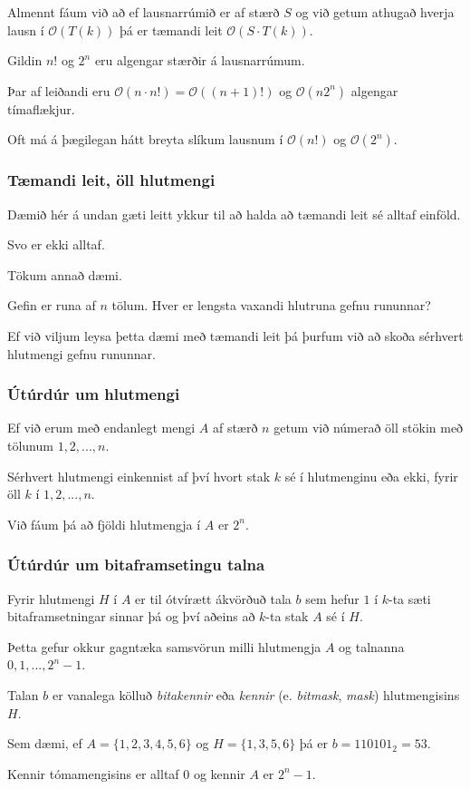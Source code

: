 {
	{
		\item<1-> Almennt fáum við að ef lausnarrúmið er af stærð $S$ og við getum athugað hverja lausn í $\mathcal{O}(T(k))$
			þá er tæmandi leit $\mathcal{O}(S \cdot T(k))$.
		\item<2-> Gildin $n!$ og $2^n$ eru algengar stærðir á lausnarrúmum.
		\item<3-> Þar af leiðandi eru $\mathcal{O}(n \cdot n!) = \mathcal{O}((n + 1)!)$ og $\mathcal{O}(n 2^n)$ algengar tímaflækjur.
		\item<4-> Oft má á þægilegan hátt breyta slíkum lausnum í $\mathcal{O}(n!)$ og $\mathcal{O}(2^n)$.
	}
}

{
	\frametitle{Tæmandi leit, öll hlutmengi}
	{
		\item<1-> Dæmið hér á undan gæti leitt ykkur til að halda að tæmandi leit sé alltaf einföld.
		\item<2-> Svo er ekki alltaf.
		\item<3-> Tökum annað dæmi.
		\item<4-> Gefin er runa af $n$ tölum. Hver er lengsta vaxandi hlutruna gefnu rununnar?
		\item<5-> Ef við viljum leysa þetta dæmi með tæmandi leit þá þurfum við að skoða sérhvert hlutmengi gefnu rununnar.
	}
}

{
	\frametitle{Útúrdúr um hlutmengi}
	{
		\item<1-> Ef við erum með endanlegt mengi $A$ af stærð $n$ getum við númerað öll stökin með tölunum $1, 2, ..., n$.
		\item<2-> Sérhvert hlutmengi einkennist af því hvort stak $k$ sé í hlutmenginu eða ekki, fyrir öll $k$ í $1, 2, ..., n$.
		\item<3-> Við fáum þá að fjöldi hlutmengja í $A$ er $2^n$.
	}
}

{
	\frametitle{Útúrdúr um bitaframsetingu talna}
	{
		\item<1-> Fyrir hlutmengi $H$ í $A$ er til ótvírætt ákvörðuð tala $b$ sem hefur $1$ í
			$k$-ta sæti bitaframsetningar sinnar þá og því aðeins að $k$-ta stak $A$ sé í $H$.
		\item<2-> Þetta gefur okkur gagntæka samsvörun milli hlutmengja $A$ og talnanna $0, 1, ..., 2^n - 1$.
		\item<3-> Talan $b$ er vanalega kölluð \emph{bitakennir} eða \emph{kennir} (e. \emph{bitmask}, \emph{mask}) hlutmengisins $H$.
		\item<4-> Sem dæmi, ef $A = \{1, 2, 3, 4, 5, 6\}$ og $H = \{1, 3, 5, 6\}$ þá er $b = 110101_2 = 53$.
		\item<5-> Kennir tómamengisins er alltaf $0$ og kennir $A$ er $2^n - 1$.
	}
}

